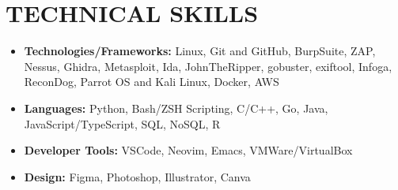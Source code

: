 \documentclass[letterpaper,11pt]{article}
\makeatletter
\newcommand{\uniformunderline}[1]{%
  \uline{\phantom{#1}}%
  \llap{\contour{white}{#1}}%
}
\newcommand{\resumeItem}[1]{
  \item\small{
    {#1 \vspace{-2pt}}
  }
}
\newcommand{\resumeSubheading}[4]{
  \vspace{-2pt}\item
    \begin{tabular*}{1.0\textwidth}[t]{l@{\extracolsep{\fill}}r}
      \textbf{\large#1} & \textbf{\small #2} \\
      \textit{\large#3} & \textit{\small #4} \\
      
    \end{tabular*}\vspace{-7pt}
}
\newcommand{\resumeSubHeadingListStart}{\begin{itemize}[leftmargin=0.0in, label={}]}
\newcommand{\resumeSubHeadingListEnd}{\end{itemize}}
\newcommand{\resumeItemListStart}{\begin{itemize}}
\newcommand{\resumeItemListEnd}{\end{itemize}\vspace{-5pt}}
\makeatother
\begin{document}
\section{TECHNICAL SKILLS}
 \begin{itemize}[leftmargin=0in, label={}]
    \small{\item{
    \resumeItemListStart
     \resumeItem{\textbf{\normalsize{Technologies/Frameworks:}}{ \normalsize{Linux, Git and GitHub, BurpSuite, ZAP, Nessus, Ghidra, Metasploit, Ida, JohnTheRipper, gobuster, exiftool, Infoga, ReconDog, Parrot OS and Kali Linux, Docker}, AWS}} \\
     \resumeItem{\textbf{\normalsize{Languages:}}{ \normalsize{Python, Bash/ZSH Scripting, C/C++, Go, Java, JavaScript/TypeScript, SQL, NoSQL, R}}} \\
     \resumeItem{\textbf{\normalsize{Developer Tools:}}{ \normalsize{VSCode, Neovim, Emacs, VMWare/VirtualBox}}} \\
     \resumeItem{\textbf{\normalsize{Design:}}{ \normalsize{Figma, Photoshop, Illustrator, Canva}}}
     \resumeItemListEnd
    }}
 \end{itemize}
 \vspace{-10pt}



% 
%   



\end{document}
